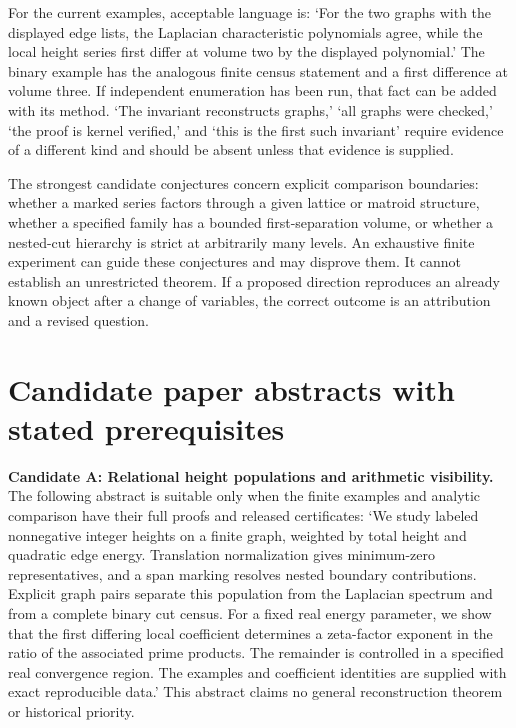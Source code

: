 \documentclass[
  11pt,
  a4paper,
]{report}
\begin{document}
For the current examples, acceptable language is: `For the two graphs
with the displayed edge lists, the Laplacian characteristic polynomials
agree, while the local height series first differ at volume two by the
displayed polynomial.' The binary example has the analogous finite
census statement and a first difference at volume three. If independent
enumeration has been run, that fact can be added with its method. `The
invariant reconstructs graphs,' `all graphs were checked,' `the proof is
kernel verified,' and `this is the first such invariant' require
evidence of a different kind and should be absent unless that evidence
is supplied.

The strongest candidate conjectures concern explicit comparison
boundaries: whether a marked series factors through a given lattice or
matroid structure, whether a specified family has a bounded
first-separation volume, or whether a nested-cut hierarchy is strict at
arbitrarily many levels. An exhaustive finite experiment can guide these
conjectures and may disprove them. It cannot establish an unrestricted
theorem. If a proposed direction reproduces an already known object
after a change of variables, the correct outcome is an attribution and a
revised question.

\hypertarget{candidate-paper-abstracts-with-stated-prerequisites}{%
\section{Candidate paper abstracts with stated
prerequisites}\label{candidate-paper-abstracts-with-stated-prerequisites}}

\textbf{Candidate A: Relational height populations and arithmetic
visibility.} The following abstract is suitable only when the finite
examples and analytic comparison have their full proofs and released
certificates: `We study labeled nonnegative integer heights on a finite
graph, weighted by total height and quadratic edge energy. Translation
normalization gives minimum-zero representatives, and a span marking
resolves nested boundary contributions. Explicit graph pairs separate
this population from the Laplacian spectrum and from a complete binary
cut census. For a fixed real energy parameter, we show that the first
differing local coefficient determines a zeta-factor exponent in the
ratio of the associated prime products. The remainder is controlled in a
specified real convergence region. The examples and coefficient
identities are supplied with exact reproducible data.' This abstract
claims no general reconstruction theorem or historical priority.
\end{document}
